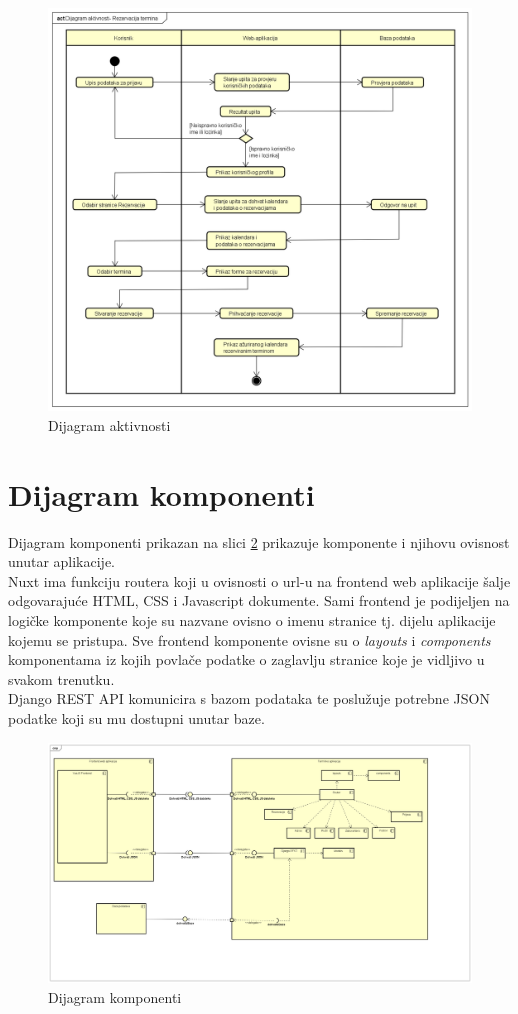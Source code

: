 		
				\begin{figure}[H]
				\includegraphics[width=1\linewidth]{slike/Dijagram aktivnosti.png}
				\centering
				\caption{Dijagram aktivnosti}
				\label{fig:dijagram_aktivnosti}
			\end{figure}
			\eject
		\section{Dijagram komponenti}
		
			Dijagram komponenti prikazan na slici \ref{fig:dijagram_komponenti} prikazuje komponente i njihovu ovisnost unutar aplikacije. \\Nuxt ima funkciju routera koji u ovisnosti o url-u na frontend web aplikacije šalje odgovarajuće HTML, CSS i Javascript dokumente. Sami frontend je podijeljen na logičke komponente koje su nazvane ovisno o imenu stranice tj. dijelu aplikacije kojemu se pristupa. Sve frontend komponente ovisne su o \textit{layouts} i \textit{components} komponentama iz kojih povlače podatke o zaglavlju stranice koje je vidljivo u svakom trenutku.\\ Django REST API komunicira s bazom podataka te poslužuje potrebne JSON podatke koji su mu dostupni unutar baze.
			
			\begin{figure}[H]
				\includegraphics[width=.9\linewidth]{slike/dijagram_komponenti.PNG}
				\centering
				\caption{Dijagram komponenti}
				\label{fig:dijagram_komponenti}
			\end{figure}
